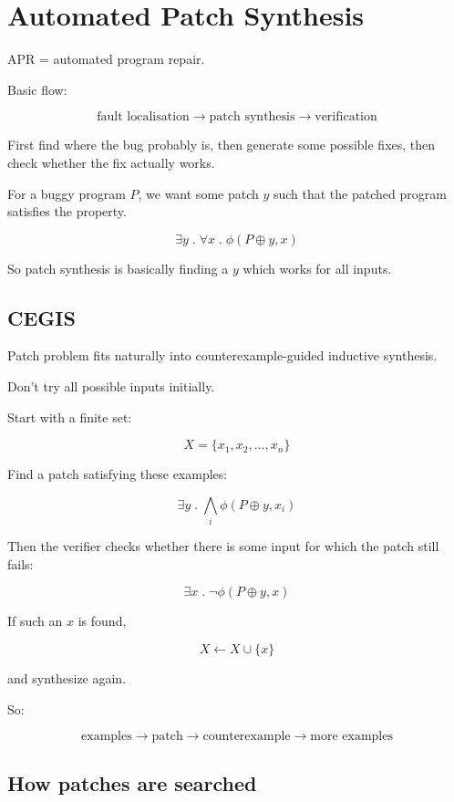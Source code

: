 \documentclass[11pt]{book}
\begin{document}
\setcounter{chapter}{5}
\chapter{Automated Patch Synthesis}

APR = automated program repair.

Basic flow:

\[
\text{fault localisation}
\rightarrow
\text{patch synthesis}
\rightarrow
\text{verification}
\]

First find where the bug probably is,
then generate some possible fixes,
then check whether the fix actually works.

For a buggy program $P$, we want some patch $y$
such that the patched program satisfies the property.

\[
\exists y\;.\;\forall x\;.\;
\phi(P\oplus y,x)
\]

So patch synthesis is basically finding a $y$
which works for all inputs.

\section{CEGIS}

Patch problem fits naturally into
counterexample-guided inductive synthesis.

Don't try all possible inputs initially.

Start with a finite set:

\[
X=\{x_1,x_2,\ldots,x_n\}
\]

Find a patch satisfying these examples:

\[
\exists y\;.\;
\bigwedge_i \phi(P\oplus y,x_i)
\]

Then the verifier checks whether there is some input
for which the patch still fails:

\[
\exists x\;.\;
\neg\phi(P\oplus y,x)
\]

If such an $x$ is found,

\[
X \leftarrow X\cup\{x\}
\]

and synthesize again.

So:

\[
\text{examples}
\rightarrow
\text{patch}
\rightarrow
\text{counterexample}
\rightarrow
\text{more examples}
\]

\section{How patches are searched}
\end{document}

